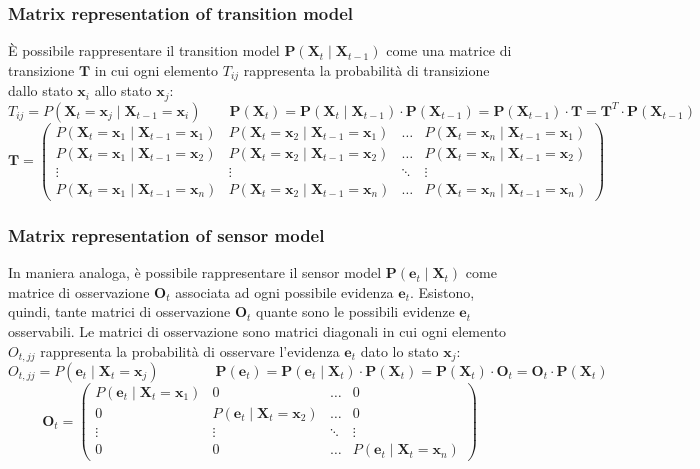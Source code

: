 \subsubsection*{Matrix representation of transition model}
È possibile rappresentare il transition model \(\textbf{P}(\textbf{X}_t \mid \textbf{X}_{t-1})\) come una matrice di transizione
\(\textbf{T}\) in cui ogni elemento \(T_{ij}\) rappresenta la probabilità di transizione dallo stato \(\textbf{x}_i\) allo stato \(\textbf{x}_j\):
\[T_{ij} = P(\textbf{X}_t = \textbf{x}_j \mid \textbf{X}_{t-1} = \textbf{x}_i) \qquad \textbf{P}(\textbf{X}_t) = \textbf{P}(\textbf{X}_t \mid \textbf{X}_{t-1}) \cdot \textbf{P}(\textbf{X}_{t-1}) = \textbf{P}(\textbf{X}_{t-1}) \cdot \textbf{T} = \textbf{T}^T \cdot \textbf{P}(\textbf{X}_{t-1})\]
\[\textbf{T} = \left(\begin{matrix}
	P(\textbf{X}_t = \textbf{x}_1 \mid \textbf{X}_{t-1} = \textbf{x}_1) & P(\textbf{X}_t = \textbf{x}_2 \mid \textbf{X}_{t-1} = \textbf{x}_1) & \dots & P(\textbf{X}_t = \textbf{x}_n \mid \textbf{X}_{t-1} = \textbf{x}_1) \\
	P(\textbf{X}_t = \textbf{x}_1 \mid \textbf{X}_{t-1} = \textbf{x}_2) & P(\textbf{X}_t = \textbf{x}_2 \mid \textbf{X}_{t-1} = \textbf{x}_2) & \dots & P(\textbf{X}_t = \textbf{x}_n \mid \textbf{X}_{t-1} = \textbf{x}_2) \\
	\vdots & \vdots & \ddots & \vdots \\
	P(\textbf{X}_t = \textbf{x}_1 \mid \textbf{X}_{t-1} = \textbf{x}_n) & P(\textbf{X}_t = \textbf{x}_2 \mid \textbf{X}_{t-1} = \textbf{x}_n) & \dots & P(\textbf{X}_t = \textbf{x}_n \mid \textbf{X}_{t-1} = \textbf{x}_n)
\end{matrix}\right)\]

\subsubsection*{Matrix representation of sensor model}
In maniera analoga, è possibile rappresentare il sensor model \(\textbf{P}(\textbf{e}_t \mid \textbf{X}_t)\) come matrice
di osservazione \(\textbf{O}_t\) associata ad ogni possibile evidenza \(\textbf{e}_t\). Esistono, quindi, tante matrici di
osservazione \(\textbf{O}_t\) quante sono le possibili evidenze \(\textbf{e}_t\) osservabili. Le matrici di osservazione
sono matrici diagonali in cui ogni elemento \(O_{t,jj}\) rappresenta la probabilità di osservare l'evidenza \(\textbf{e}_t\)
dato lo stato \(\textbf{x}_j\):
\[O_{t,jj} = P(\textbf{e}_t \mid\textbf{X}_t = \textbf{x}_j) \qquad\qquad \textbf{P}(\textbf{e}_t) = \textbf{P}(\textbf{e}_t \mid\textbf{X}_t) \cdot \textbf{P}(\textbf{X}_t) = \textbf{P}(\textbf{X}_t) \cdot \textbf{O}_t = \textbf{O}_t \cdot \textbf{P}(\textbf{X}_t)\]
\[\textbf{O}_t = \left(\begin{matrix}
	P(\textbf{e}_t \mid \textbf{X}_t = \textbf{x}_1) & 0 & \dots & 0 \\
	0 & P(\textbf{e}_t \mid \textbf{X}_t = \textbf{x}_2) & \dots & 0 \\
	\vdots & \vdots & \ddots & \vdots \\
	0 & 0 & \dots & P(\textbf{e}_t \mid \textbf{X}_t = \textbf{x}_n)
\end{matrix}\right)\]

